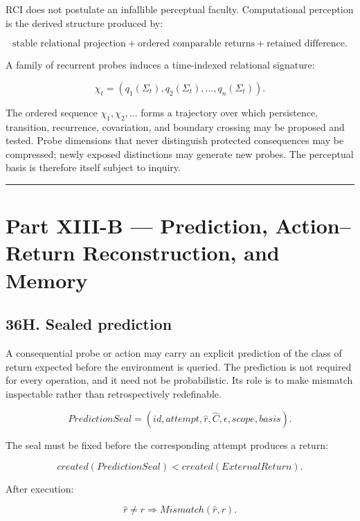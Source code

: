 \documentclass[
]{article}
\begin{document}
RCI does not postulate an infallible perceptual faculty. Computational
perception is the derived structure produced by:

\[
\boxed{
\text{stable relational projection}
+
\text{ordered comparable returns}
+
\text{retained difference}.
}
\]

A family of recurrent probes induces a time-indexed relational signature:

\[
\boxed{
\chi_t
=
(q_1(\Sigma_t),q_2(\Sigma_t),\ldots,q_n(\Sigma_t)).
}
\]

The ordered sequence \(\chi_1,\chi_2,\ldots\) forms a trajectory over which
persistence, transition, recurrence, covariation, and boundary crossing may be
proposed and tested. Probe dimensions that never distinguish protected
consequences may be compressed; newly exposed distinctions may generate new
probes. The perceptual basis is therefore itself subject to inquiry.

\begin{center}\rule{0.5\linewidth}{0.5pt}\end{center}


\section{Part XIII-B --- Prediction, Action--Return Reconstruction, and
Memory}\label{part-xiii-b-prediction-action-return-reconstruction-and-memory}

\subsection{36H. Sealed prediction}\label{sealed-prediction}

A consequential probe or action may carry an explicit prediction of the class
of return expected before the environment is queried. The prediction is not
required for every operation, and it need not be probabilistic. Its role is to
make mismatch inspectable rather than retrospectively redefinable.

\[
\boxed{
PredictionSeal
=
(
id,
attempt,
\widehat r,
\widehat C,
\epsilon,
scope,
basis
).
}
\]

The seal must be fixed before the corresponding attempt produces a return:

\[
\boxed{
created(PredictionSeal)
<
created(ExternalReturn).
}
\]

After execution:

\[
\boxed{
\widehat r\neq r
\Rightarrow
Mismatch(\widehat r,r).
}
\]
\end{document}
